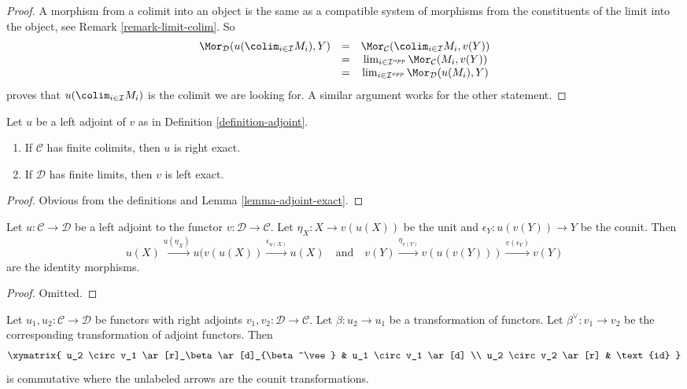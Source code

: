 \begin{proof}
A morphism from a colimit into an object is the same as a compatible
system of morphisms from the constituents of the limit into the
object, see Remark \ref{remark-limit-colim}. So
$$
\begin{matrix}
\Mor_\mathcal{D}(u(\colim_{i \in \mathcal{I}} M_i), Y) &
= & \Mor_\mathcal{C}(\colim_{i \in \mathcal{I}} M_i, v(Y)) \\
& = &
\lim_{i \in \mathcal{I}^{opp}}
\Mor_\mathcal{C}(M_i, v(Y)) \\
& = &
\lim_{i \in \mathcal{I}^{opp}}
\Mor_\mathcal{D}(u(M_i), Y)
\end{matrix}
$$
proves that $u(\colim_{i \in \mathcal{I}} M_i)$ is
the colimit we are looking for.
A similar argument works for the other statement.
\end{proof}

\begin{lemma}
\label{lemma-exact-adjoint}
Let $u$ be a left adjoint of $v$ as in Definition \ref{definition-adjoint}.
\begin{enumerate}
\item If $\mathcal{C}$ has finite colimits, then $u$ is right exact.
\item If $\mathcal{D}$ has finite limits, then $v$ is left exact.
\end{enumerate}
\end{lemma}

\begin{proof}
Obvious from the definitions and Lemma \ref{lemma-adjoint-exact}.
\end{proof}

\begin{lemma}
\label{lemma-unit-counit-relations}
Let $u : \mathcal{C} \to \mathcal{D}$ be a left adjoint to the functor
$v : \mathcal{D} \to \mathcal{C}$. Let $\eta_X : X \to v(u(X))$ be the unit
and $\epsilon_Y : u(v(Y)) \to Y$ be the counit. Then
$$
u(X) \xrightarrow{u(\eta_X)} u(v(u(X))
\xrightarrow{\epsilon_{u(X)}} u(X)
\quad\text{and}\quad
v(Y) \xrightarrow{\eta_{v(Y)}} v(u(v(Y))) \xrightarrow{v(\epsilon_Y)}
v(Y)
$$
are the identity morphisms.
\end{lemma}

\begin{proof}
Omitted.
\end{proof}

\begin{lemma}
\label{lemma-transformation-between-functors-and-adjoints}
Let $u_1, u_2 : \mathcal{C} \to \mathcal{D}$ be functors with right
adjoints $v_1, v_2 : \mathcal{D} \to \mathcal{C}$. Let $\beta : u_2 \to u_1$
be a transformation of functors. Let $\beta^\vee : v_1 \to v_2$ be
the corresponding transformation of adjoint functors. Then
$$
\xymatrix{
u_2 \circ v_1 \ar[r]_\beta \ar[d]_{\beta^\vee} &
u_1 \circ v_1 \ar[d] \\
u_2 \circ v_2 \ar[r] & \text{id}
}
$$
is commutative where the unlabeled arrows are the counit transformations.
\end{lemma}

